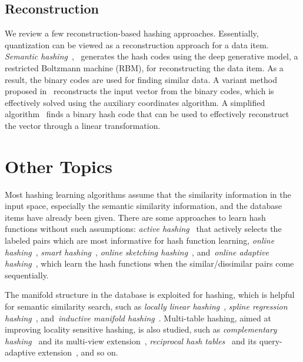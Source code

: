\documentclass[10pt,journal,compsoc]{IEEEtran}
\begin{document}
\subsection{Reconstruction}
We review a few reconstruction-based hashing approaches.
Essentially, quantization can be viewed as a reconstruction approach
for a data item.
\emph{Semantic hashing}~\cite{SalakhutdinovH07},~\cite{SalakhutdinovH09}
generates the hash codes using the deep generative model,
a restricted Boltzmann machine (RBM),
for reconstructing the data item.
As a result, the binary codes are used for finding similar data.
A variant method proposed in~\cite{Carreira-Perpinan15}
reconstructs the input vector from the binary codes,
which is effectively solved using the auxiliary coordinates algorithm.
A simplified algorithm~\cite{BaluFJ14}
finds a binary hash code
that can be used to effectively reconstruct the vector
through a linear transformation.

\section{Other Topics}
\label{sec:others}
Most hashing learning algorithms
assume that the similarity information in the input space,
especially the semantic similarity information,
and the database items
have already been given.
There are some approaches to
learn hash functions without such assumptions:
\emph{active hashing}~\cite{ZhenY13}
that actively selects the labeled pairs which are most informative
for hash function learning,
\emph{online hashing}~\cite{HuangYZ13},
\emph{smart hashing}~\cite{YangHZL13},
\emph{online sketching hashing}~\cite{LengWC0L15},
and~\emph{online adaptive hashing}~\cite{CakirS15},
which learn the hash functions
when the similar/dissimilar pairs come
sequentially.


The manifold structure in the database
is exploited
for hashing,
which is helpful
for semantic similarity search,
such as
\emph{locally linear hashing}~\cite{IrieLWC14},
\emph{spline regression hashing}~\cite{LiuWYZH12},
and~\emph{inductive manifold hashing}~\cite{ShenSSHT13}.
Multi-table hashing,
aimed at improving locality sensitive hashing,
is also studied,
such as
\emph{complementary hashing}~\cite{XuWLZLY11}
and its multi-view extension~\cite{LiuHDLL15},
\emph{reciprocal hash tables}~\cite{LiuHL13}
and its query-adaptive extension~\cite{LiuDLTL16},
and so on.
\end{document}
